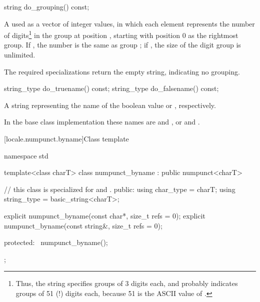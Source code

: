 %
\begin{itemdecl}
string do_grouping() const;
\end{itemdecl}

\begin{itemdescr}
\pnum
\returns
A   used as a vector of integer values,
in which each element
represents the number of digits\footnote{Thus, the string
 specifies groups of 3 digits each, and
 probably indicates groups of 51 (!) digits each,
because 51 is the ASCII value of .}
in the group at position , starting with position 0 as the
rightmost group.
If
,
the number is the same as group
;
if
,
the size of the digit group is unlimited.

\pnum
The required specializations return the empty string, indicating
no grouping.
\end{itemdescr}

%
%
\begin{itemdecl}
string_type do_truename()  const;
string_type do_falsename() const;
\end{itemdecl}

\begin{itemdescr}
\pnum
\returns
A string representing the name of the boolean value
or
,
respectively.

\pnum
In the base class implementation these names are
 and , or  and .
\end{itemdescr}

[locale.numpunct.byname]{Class template }

%
\begin{codeblock}
namespace std {
  template<class charT>
    class numpunct_byname : public numpunct<charT> {
    // this class is specialized for  and .
    public:
      using char_type   = charT;
      using string_type = basic_string<charT>;

      explicit numpunct_byname(const char*, size_t refs = 0);
      explicit numpunct_byname(const string&, size_t refs = 0);

    protected:
      ~numpunct_byname();
    };
}
\end{codeblock}

